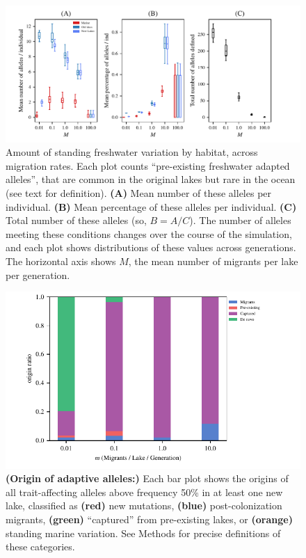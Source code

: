 \documentclass{article}
\begin{document}
\begin{figure}
	\begin{center}
  		\includegraphics{Final_Plots/Freshwater_Alleles.pdf}
  		\caption{
            Amount of standing freshwater variation by habitat, across migration rates.
            Each plot counts ``pre-existing freshwater adapted alleles'',
            that are common in the original lakes but rare in the ocean
            (see text for definition).
            \textbf{(A)} Mean number of these alleles per individual.
            \textbf{(B)} Mean percentage of these alleles per individual.
            \textbf{(C)} Total number of these alleles (so, $B = A/C$).
            The number of alleles meeting these conditions changes over the course of the simulation,
            and each plot shows distributions of these values across generations.
            The horizontal axis shows $M$, the mean number of migrants per lake per generation.
		}
		\label{fig:MPFAI}
	\end{center}
\end{figure}


\begin{figure}
	\begin{center}
  		\includegraphics[width=0.7\linewidth]{Final_Plots/Allele_Origin.pdf}
  		\caption{ 
        \textbf{(Origin of adaptive alleles:)}
        Each bar plot shows the origins
		of all trait-affecting alleles above frequency 50\% in at least one new lake,
        classified as
		\textbf{(red)} new mutations,
		\textbf{(blue)} post-colonization migrants,
		\textbf{(green)} ``captured'' from pre-existing lakes, or
		\textbf{(orange)} standing marine variation.
        See Methods for precise definitions of these categories.
		}
  		\label{fig:Origin}
	\end{center}
\end{figure}
\end{document}
